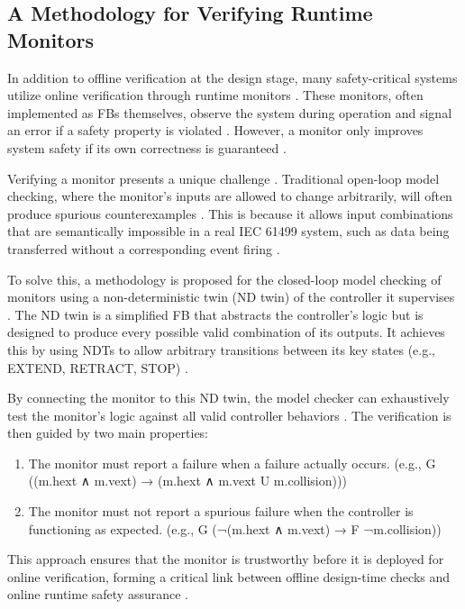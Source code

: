 \subsection{A Methodology for Verifying Runtime Monitors}

In addition to offline verification at the design stage, many safety-critical systems utilize online verification through runtime monitors \cite{17jhunjhunwala2022monitoring}. These monitors, often implemented as FBs themselves, observe the system during operation and signal an error if a safety property is violated \cite{1falcone2022runtime}. However, a monitor only improves system safety if its own correctness is guaranteed \cite{9wiesmayr2022supporting}.

Verifying a monitor presents a unique challenge \cite{15blech2016comparison}. Traditional open-loop model checking, where the monitor's inputs are allowed to change arbitrarily, will often produce spurious counterexamples \cite{12yoong2010verifying}. This is because it allows input combinations that are semantically impossible in a real IEC 61499 system, such as data being transferred without a corresponding event firing \cite{13yoong2015verification}.

To solve this, a methodology is proposed for the closed-loop model checking of monitors using a non-deterministic twin (ND twin) of the controller it supervises \cite{17jhunjhunwala2022monitoring}. The ND twin is a simplified FB that abstracts the controller's logic but is designed to produce every possible valid combination of its outputs. It achieves this by using NDTs to allow arbitrary transitions between its key states (e.g., EXTEND, RETRACT, STOP) \cite{toolchain}.

By connecting the monitor to this ND twin, the model checker can exhaustively test the monitor's logic against all valid controller behaviors \cite{nusmv}. The verification is then guided by two main properties:

\begin{enumerate}
\item The monitor must report a failure when a failure actually occurs. (e.g., G ((m.hext ∧ m.vext) → (m.hext ∧ m.vext U m.collision)))
\item The monitor must not report a spurious failure when the controller is functioning as expected. (e.g., G (¬(m.hext ∧ m.vext) → F ¬m.collision))
\end{enumerate}

This approach ensures that the monitor is trustworthy before it is deployed for online verification, forming a critical link between offline design-time checks and online runtime safety assurance \cite{17jhunjhunwala2022monitoring}.

